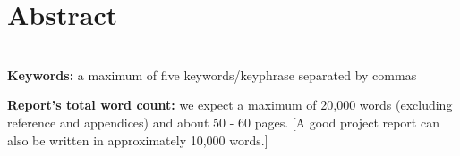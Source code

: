 \chapter*{\center \Large  Abstract}

~\\[1cm]
\noindent %
\textbf{Keywords:} a maximum of five keywords/keyphrase separated by commas

\vfill
\noindent
\textbf{Report's total word count:} we expect a maximum of 20,000 words (excluding reference and appendices) and about 50 - 60 pages. [A good project report can also be written in approximately 10,000 words.]

